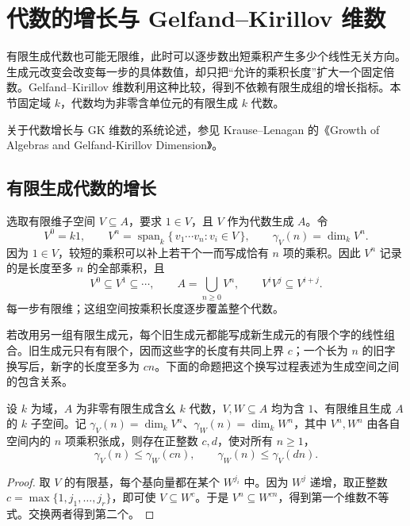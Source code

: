 
\section{代数的增长与 Gelfand–Kirillov 维数}
\label{b2:sec:1904}

有限生成代数也可能无限维，此时可以逐步数出短乘积产生多少个线性无关方向。生成元改变会改变每一步的具体数值，却只把“允许的乘积长度”扩大一个固定倍数。Gelfand–Kirillov 维数利用这种比较，得到不依赖有限生成组的增长指标。本节固定域 \(k\)，代数均为非零含单位元的有限生成 \(k\) 代数。

关于代数增长与 GK 维数的系统论述，参见 Krause–Lenagan 的《Growth of Algebras and Gelfand-Kirillov Dimension》\cite[Chapters~1--2]{KrauseLenagan2000GrowthAlgebras}。

%
%

\subsection{有限生成代数的增长}
\label{b2:subsec:1904:01}

选取有限维子空间 \(V\subseteq A\)，要求 \(1\in V\)，且 \(V\) 作为代数生成 \(A\)。令
\[
	V^0=k1,\qquad V^n=\operatorname{span}_k\{\,v_1\cdots v_n:v_i\in V\,\}, \qquad \gamma_V(n)=\dim_kV^n.
\]
因为 \(1\in V\)，较短的乘积可以补上若干个一而写成恰有 \(n\) 项的乘积。因此 \(V^n\) 记录的是长度至多 \(n\) 的全部乘积，且
\[
	V^0\subseteq V^1\subseteq\cdots,\qquad A=\bigcup_{n\ge0}V^n,\qquad V^iV^j\subseteq V^{i+j}.
\]
每一步有限维；这组空间按乘积长度逐步覆盖整个代数。

若改用另一组有限生成元，每个旧生成元都能写成新生成元的有限个字的线性组合。旧生成元只有有限个，因而这些字的长度有共同上界 \(c\)；一个长为 \(n\) 的旧字换写后，新字的长度至多为 \(cn\)。下面的命题把这个换写过程表述为生成空间之间的包含关系。

\begin{proposition}\label{b2:prop:growth-comparison}
	设 \(k\) 为域，\(A\) 为非零有限生成含幺 \(k\) 代数，\(V,W\subseteq A\) 均为含 \(1\)、有限维且生成 \(A\) 的 \(k\) 子空间。记 \(\gamma_V(n)=\dim_kV^n\)、\(\gamma_W(n)=\dim_kW^n\)，其中 \(V^n,W^n\) 由各自空间内的 \(n\) 项乘积张成，则存在正整数 \(c,d\)，使对所有 \(n\ge1\)，
	\[
		\gamma_V(n)\le\gamma_W(cn),\qquad \gamma_W(n)\le\gamma_V(dn).
	\]
\end{proposition}
\begin{proof}
	取 \(V\) 的有限基，每个基向量都在某个 \(W^{j_i}\) 中。因为 \(W^j\) 递增，取正整数 \(c=\max\{1,j_1,\ldots,j_r\}\)，即可使 \(V\subseteq W^c\)。于是 \(V^n\subseteq W^{cn}\)，得到第一个维数不等式。交换两者得到第二个。
\end{proof}

